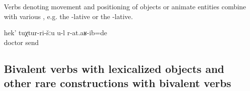 Verbs denoting movement and positioning of objects or animate entities combine with various , e.g. the -lative or the -lative.
%
\begin{exe}
	\ex	\label{ex:verbs movement position}
	\begin{xlist}
		\ex	{} 
		\ex	{}  
		\ex	{} 
		\ex	{} 
	\end{xlist}

	\ex	\label{ex:You sent me to the doctor}
	\gll	hek'	tuχtur-ri-šːu	u-l	r-at.aʁ-ib=de\\
			doctor		send\\
	\glt	{}
\end{exe}



\subsection{Bivalent verbs with lexicalized objects and other rare constructions with bivalent verbs}
\label{sec:Bivalent verbs with frozen objects}

